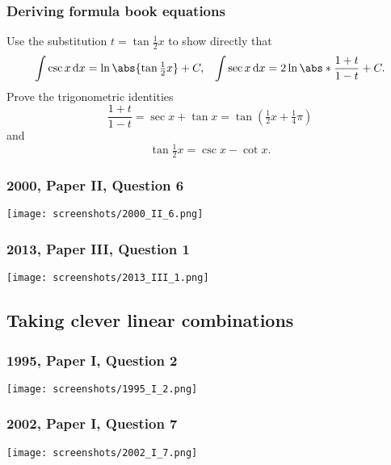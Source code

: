 \documentclass[a4paper,12pt]{article}
\begin{document}
\subsubsection{Deriving formula book equations}

Use the substitution \(t = \tan \tfrac 12 x\) to show directly that
\begin{align*}
 \int \csc x\,\mathrm dx = \ln \abs{\tan \tfrac 12 x} + C,&&
 \int \sec x\,\mathrm dx = 2 \ln \abs*{\frac{1 + t}{1 - t}} + C.
\end{align*}
Prove the trigonometric identities
\begin{equation*}
 \frac{1 + t}{1 - t} = \sec x + \tan x = \tan(\tfrac 12 x + \tfrac 14 \pi)
\end{equation*}
and
\begin{equation*}
 \tan \tfrac 12 x = \csc x - \cot x.
\end{equation*}

\subsubsection{2000, Paper II, Question 6}
\begin{center}
 \texttt{[image: screenshots/2000\_II\_6.png]}
\end{center}

\subsubsection{2013, Paper III, Question 1}
\begin{center}
 \texttt{[image: screenshots/2013\_III\_1.png]}
\end{center}

\subsection{Taking clever linear combinations}

\subsubsection{1995, Paper I, Question 2}
\begin{center}
 \texttt{[image: screenshots/1995\_I\_2.png]}
\end{center}

\subsubsection{2002, Paper I, Question 7}
\begin{center}
 \texttt{[image: screenshots/2002\_I\_7.png]}
\end{center}
\end{document}
